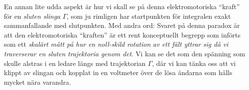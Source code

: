{{{{En annan lite udda aspekt {\"a}r hur vi skall se p{\aa} denna elektromotoriska
``kraft'' f{\"o}r en {\it sluten slinga} $\Gamma$, som ju rimligen har
startpunkten f{\"o}r integralen exakt sammanfallande med slutpunkten.
Med andra ord:
\noindent
{}
Svaret p{\aa} denna paradox {\"a}r att den elektromotoriska ``kraften'' {\"a}r
ett rent konceptuellt begrepp som inf{\"o}rts som ett {\it skal{\"a}rt m{\aa}tt
p{\aa} hur en noll-skild rotation av ett f{\"a}lt yttrar sig d{\aa} vi
traverserar en sluten trajektoria genom det}.
Vi kan se det som den sp{\"a}nning som skulle alstras i en ledare l{\"a}ngs med
trajektorian $\Gamma$, d{\"a}r vi kan t{\"a}nka oss att vi klippt av slingan
och kopplat in en voltmeter {\"o}ver de l{\"o}sa {\"a}ndarna som h{\aa}lls
mycket n{\"a}ra varandra.
\vfill\eject

}}}}
